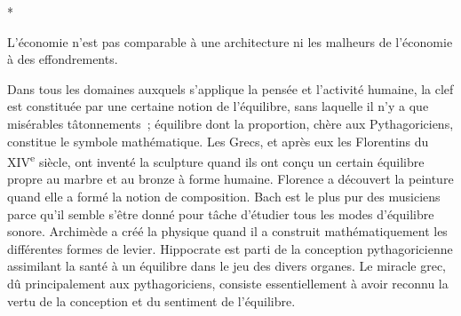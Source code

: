 \documentclass[french,twoside]{book} %
\begin{document}
\begin{center}
\noindent \centerline{*}\par
\end{center}

\noindent L'économie n'est pas comparable à une architecture ni les malheurs de l'économie à des effondrements.\par
Dans tous les domaines auxquels s'applique la pensée et l'activité humaine, la clef est constituée par une certaine notion de l'équilibre, sans laquelle il n'y a que misérables tâtonnements ; équilibre dont la proportion, chère aux Pythagoriciens, constitue le symbole mathématique. Les Grecs, et après eux les Florentins du XIV\textsuperscript{e} siècle, ont inventé la sculpture quand ils ont conçu un certain équilibre propre au marbre et au bronze à forme humaine. Florence a découvert la peinture quand elle a formé la notion de composition. Bach est le plus pur des musiciens parce qu'il semble s'être donné pour tâche d'étudier tous les modes d'équilibre sonore. Archimède a créé la physique quand il a construit mathématiquement les différentes formes de levier. Hippocrate est parti de la conception pythagoricienne assimilant la santé à un équilibre dans le jeu des divers organes. Le miracle grec, dû principalement aux pythago­riciens, consiste essentiellement à avoir reconnu la vertu de la conception et du sentiment de l'équilibre.\par
\end{document}
